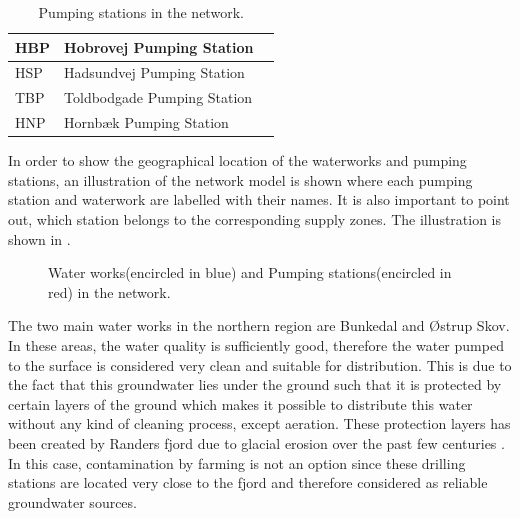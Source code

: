 \vspace{-3mm}

\begin{table}[H]
\begin{center}
    \begin{tabular}{| l | l | l |}
    \hline
    HBP & Hobrovej Pumping Station   \\ \hline
    HSP & Hadsundvej Pumping Station  \\ \hline
    TBP & Toldbodgade Pumping Station  \\ \hline
    HNP & Hornbæk Pumping Station   \\
    \hline
    \end{tabular}
\end{center}
\vspace{-3mm}
\caption{Pumping stations in the network.}
\end{table}

\vspace{-3mm}

In order to show the geographical location of the waterworks and pumping stations, an illustration of the network model is shown where each pumping station and waterwork are labelled with their names. It is also important to point out, which station belongs to the corresponding supply zones. The illustration is shown in .

\begin{figure}[H]
\centering
 
\caption{Water works(encircled in blue) and Pumping stations(encircled in red) in the network.}
\vspace{-3mm}
\label{fig:pumping_stations_and_waterworks}
\end{figure}

The two main water works in the northern region are Bunkedal and Østrup Skov. In these areas, the water quality is sufficiently good, therefore the water pumped to the surface is considered very clean and suitable for distribution. This is due to the fact that this groundwater lies under the ground such that it is protected by certain layers of the ground which makes it possible to distribute this water without any kind of cleaning process, except aeration. These protection layers has been created by Randers fjord due to glacial erosion over the past few centuries \cite{geological1909water}. In this case, contamination by farming is not an option since these drilling stations are located very close to the fjord and therefore considered as reliable groundwater sources. 

